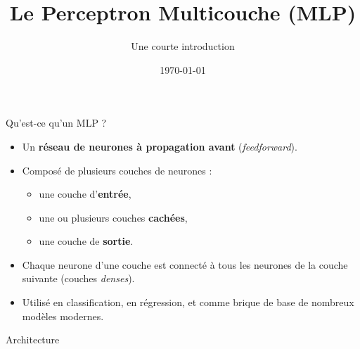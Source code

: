 \documentclass{beamer}
\title{Le Perceptron Multicouche (MLP)}
\subtitle{Une courte introduction}
\author{}
\date{\today}
\begin{document}
\begin{frame}
  \titlepage
\end{frame}

\begin{frame}{Qu'est-ce qu'un MLP ?}
  \begin{itemize}
    \item Un \textbf{réseau de neurones à propagation avant} (\emph{feedforward}).
    \item Composé de plusieurs couches de neurones :
    \begin{itemize}
      \item une couche d'\textbf{entrée},
      \item une ou plusieurs couches \textbf{cachées},
      \item une couche de \textbf{sortie}.
    \end{itemize}
    \item Chaque neurone d'une couche est connecté à tous les neurones de la couche suivante (couches \emph{denses}).
    \item Utilisé en classification, en régression, et comme brique de base de nombreux modèles modernes.
  \end{itemize}
\end{frame}

\begin{frame}{Architecture}
  \centering
\end{frame}
\end{document}
